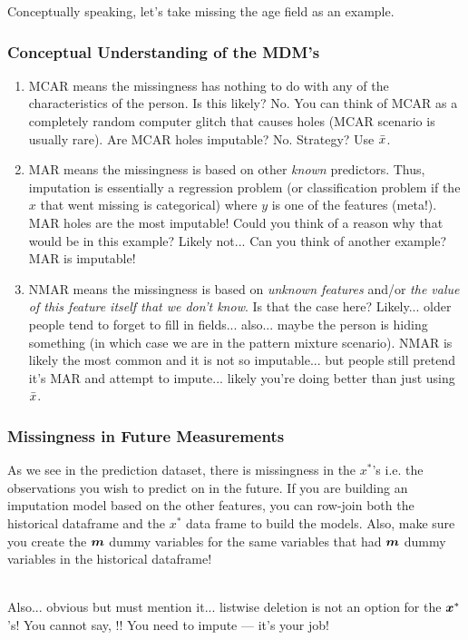 \documentclass[handout]{beamer}
\begin{document}
Conceptually speaking, let's take missing the age field as an example. 




\begin{frame}\frametitle{Conceptual Understanding of the MDM's}
\vspace{-0.25cm}
\small
\begin{enumerate}
\item MCAR means the missingness has nothing to do with any of the characteristics of the person. Is this likely? \pause No. You can think of MCAR as a completely random computer glitch that causes holes (MCAR scenario is usually rare). Are MCAR holes imputable? \pause No. Strategy? \pause Use $\bar{x}$. \pause \vspace{-0.1cm}
\item MAR means the missingness is based on other \textit{known} predictors. Thus, imputation is essentially a regression problem (or classification problem if the $x$ that went missing is categorical) where $y$ is one of the features (meta!). MAR holes are the most imputable! \pause Could you think of a reason why that would be in this example? \pause Likely not... Can you think of another example? \pause MAR is imputable! \pause \vspace{-0.1cm}
\item NMAR means the missingness is based on \textit{unknown features} and/or \textit{the value of this feature itself that we don't know}. \pause Is that the case here? \pause Likely... older people tend to forget to fill in fields... also... maybe the person is hiding something (in which case we are in the pattern mixture scenario). \pause NMAR is likely the most common and it is not so imputable... \pause but people still pretend it's MAR and attempt to impute... likely you're doing better than just using $\bar{x}$.
\end{enumerate}
\end{frame}


\begin{frame}\frametitle{Missingness in Future Measurements}

As we see in the prediction dataset, there is missingness in the $x^*$'s i.e. the observations you wish to predict on in the future. \pause If you are building an imputation model based on the other features, you can row-join both the historical dataframe and the $x^*$ data frame to build the models. \pause Also, make sure you create the $\boldsymbol{m}$ dummy variables for the same variables that had $\boldsymbol{m}$ dummy variables in the historical dataframe! \\~\\ \pause

Also... obvious but must mention it... listwise deletion is not an option for the $\boldsymbol{x}^*$'s! You cannot say, !! You need to impute --- it's your job!

\end{frame}
\end{document}
